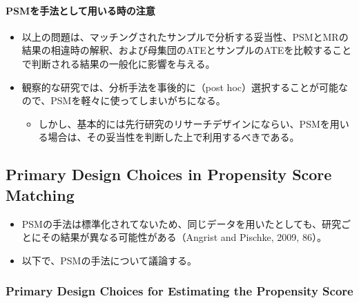 \paragraph{PSMを手法として用いる時の注意}

\begin{itemize}
 \item 以上の問題は、マッチングされたサンプルで分析する妥当性、PSMとMRの結果の相違時の解釈、および母集団のATEとサンプルのATEを比較することで判断される結果の一般化に影響を与える。
 \item 観察的な研究では、分析手法を事後的に（post hoc）選択することが可能なので、PSMを軽々に使ってしまいがちになる。
  \begin{itemize}
   \item しかし、基本的には先行研究のリサーチデザインにならい、PSMを用いる場合は、その妥当性を判断した上で利用するべきである。
  \end{itemize}
\end{itemize}

\subsection*{Primary Design Choices in Propensity Score Matching}

\begin{itemize}
 \item PSMの手法は標準化されてないため、同じデータを用いたとしても、研究ごとにその結果が異なる可能性がある（Angrist and Pischke, 2009, 86）。
 \item 以下で、PSMの手法について議論する。
\end{itemize}

\subsubsection*{Primary Design Choices for Estimating the Propensity Score}

